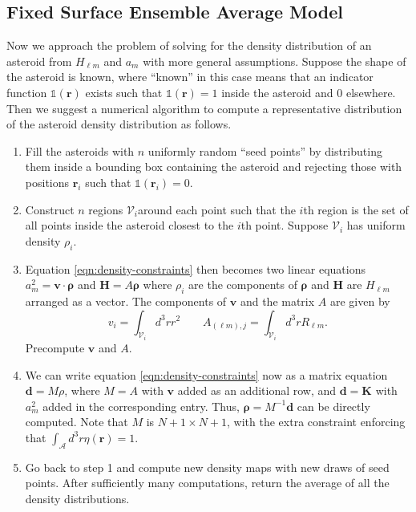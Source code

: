 \documentclass{aastex631}
\begin{document}
\subsection{Fixed Surface Ensemble Average Model}
\label{sec:numerical-density}
Now we approach the problem of solving for the density distribution of an asteroid from $H_{\ell m}$ and $a_m$ with more general assumptions. Suppose the shape of the asteroid is known, where ``known'' in this case means that an indicator function $\mathds{1}(\bm r)$ exists such that $\mathds{1}(\bm r) = 1$  inside the asteroid and 0 elsewhere. Then we suggest a numerical algorithm to compute a representative distribution of the asteroid density distribution as follows.
\begin{enumerate}
\item Fill the asteroids with $n$ uniformly random ``seed points'' by distributing them inside a bounding box containing the asteroid and rejecting those with positions $\bm r_i$ such that $\mathds{1}(\bm r_i) = 0.$
\item Construct $n$ regions $\mathcal{V}_i$around each point such that the $i$th region is the set of all points inside the asteroid closest to the $i$th point. Suppose $\mathcal{V}_i$ has uniform density $\rho_i$.
\item Equation \ref{eqn:density-constraints} then becomes two linear equations $a_m^2 = \bm v \cdot \bm \rho$ and $\bm H = A \bm \rho$ where $\rho_i$ are the components of $\bm \rho$ and $\bm H$ are $H_{\ell m}$ arranged as a vector. The components of $\bm v$ and the matrix $A$ are given by
\begin{equation}
  v_i = \int_{\mathcal{V}_i} d^3 r r^2 \qquad A_{(\ell m),j} = \int_{\mathcal{V}_i} d^3 r R_{\ell m}.
\end{equation}
Precompute $\bm v$ and $A$.
\item We can write equation \ref{eqn:density-constraints} now as a matrix equation $\bm d = M\rho$, where $M = A$ with $\bm v$ added as an additional row, and $\bm d = \bm K$ with $a_m^2$ added in the corresponding entry. Thus, $\bm \rho = M^{-1} \bm d$ can be directly computed. Note that $M$ is $N +1 \times N+1$, with the extra constraint enforcing that $\int_\mathcal{A} d^3 r\eta(\bm r) = 1$.
\item Go back to step 1 and compute new density maps with new draws of seed points. After sufficiently many computations, return the average of all the density distributions.
\end{enumerate}
\end{document}
